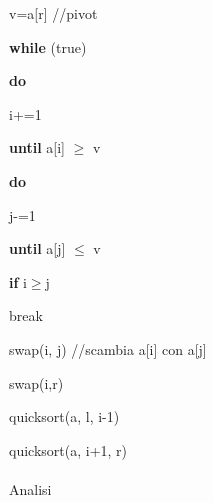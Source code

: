 \documentclass[a4paper]{book}
\begin{document}
\hspace{2em} v=a[r] //pivot

\hspace{2em} \textbf{while} (true)

\hspace{2em} \hspace{2em} \textbf{do}

\hspace{2em} \hspace{2em} \hspace{2em} i+=1

\hspace{2em} \hspace{2em} \textbf{until} a[i] $\geq$ v

\hspace{2em} \hspace{2em} \textbf{do}

\hspace{2em} \hspace{2em} \hspace{2em} j-=1

\hspace{2em} \hspace{2em} \textbf{until}  a[j] $\leq$ v

\hspace{2em} \hspace{2em} \textbf{if} i$\geq$j

\hspace{2em} \hspace{2em} \hspace{2em} break

\hspace{2em} \hspace{2em} swap(i, j) //scambia a[i] con a[j]

\hspace{2em} swap(i,r)

\hspace{2em} quicksort(a, l, i-1)

\hspace{2em} quicksort(a, i+1, r)
      
      
\paragraph{}Analisi
\end{document}
